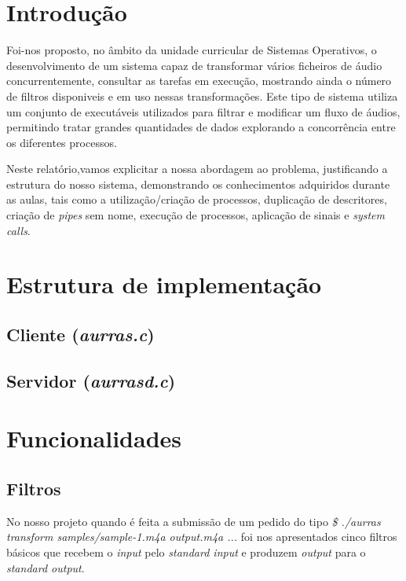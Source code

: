 \documentclass[11pt,a4paper]{report}
\begin{document}
\tableofcontents %

\chapter{Introdução}

Foi-nos proposto, no âmbito da unidade curricular de Sistemas Operativos, o desenvolvimento de um sistema capaz de transformar vários ficheiros de áudio concurrentemente, consultar as tarefas em execução, mostrando ainda o número de filtros disponiveis e em uso nessas transformações. Este tipo de
sistema utiliza um conjunto de executáveis utilizados para filtrar e modificar um fluxo de áudios, permitindo tratar grandes quantidades de dados explorando a
concorrência entre os diferentes processos.

Neste relatório,vamos explicitar a nossa abordagem ao problema, justificando a estrutura do nosso sistema, demonstrando os
conhecimentos adquiridos durante as aulas, tais como a utilização/criação de processos, duplicação de descritores, criação de \emph{pipes} sem nome, execução de processos, aplicação de sinais e  \emph{system calls}.

\chapter{Estrutura de implementação}

\section{Cliente (\emph{aurras.c})}

\section{Servidor (\emph{aurrasd.c})}

\chapter{Funcionalidades}



\section{Filtros}

No nosso projeto quando é feita a submissão de um pedido do tipo \emph{\$ ./aurras transform samples/sample-1.m4a output.m4a ...} foi nos apresentados cinco filtros básicos que recebem o \emph{input} pelo \emph{standard input} e produzem \emph{output} para o \emph{standard output}.
\end{document}
